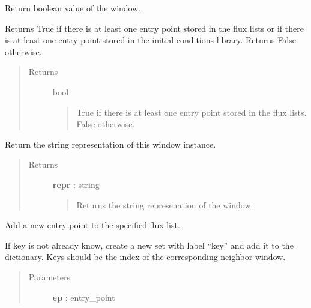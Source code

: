 \documentclass[letterpaper,10pt,english]{sphinxmanual}
\begin{document}
\begin{fulllineitems}
\begin{fulllineitems}
\label{neus/neus.doc:neus.window.Window.__nonzero__}
Return boolean value of the window.

Returns True if there is at least one entry point stored in the flux lists or if there is at least one entry point stored in the initial conditions library. Returns False otherwise.
\begin{quote}\begin{description}
\item[{Returns}] \leavevmode
bool
\begin{quote}

True if there is at least one entry point stored in the flux lists. False otherwise.
\end{quote}

\end{description}\end{quote}

\end{fulllineitems}


\begin{fulllineitems}
\label{neus/neus.doc:neus.window.Window.__repr__}
Return the string representation of this window instance.
\begin{quote}\begin{description}
\item[{Returns}] \leavevmode
\textbf{repr} : string
\begin{quote}

Returns the string represenation of the window.
\end{quote}

\end{description}\end{quote}

\end{fulllineitems}


\begin{fulllineitems}
\label{neus/neus.doc:neus.window.Window.add_entry_point}
Add a new entry point to the specified flux list.

If key is not already know, create a new set with label ``key'' and add it to the dictionary. Keys should be the index of the corresponding neighbor window.
\begin{quote}\begin{description}
\item[{Parameters}] \leavevmode
\textbf{ep} : entry\_point
\begin{quote}


\end{quote}
\end{description}
\end{quote}
\end{fulllineitems}
\end{fulllineitems}
\end{document}
